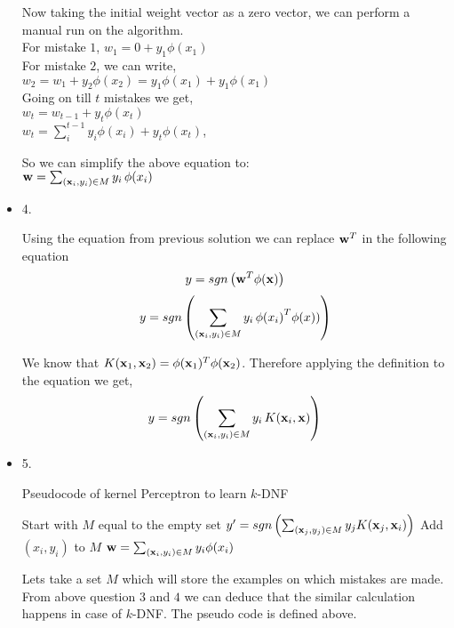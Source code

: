 \documentclass[12pt]{exam}
\newcommand{\bx}{{\bf x}}
\newcommand{\bw}{{\bf w}}
\begin{document}
\begin{itemize}
\begin{solution}
Now taking the initial weight vector as a zero vector, we can perform a manual run on the algorithm.\\

For mistake $1$, $w_1= 0 + y_1 \phi(x_1) $\\

For mistake $2$, we can write,\\
$w_2= w_1 + y_2 \phi(x_2) = y_1 \phi(x_1)+y_1 \phi(x_1)$  \\

Going on till $t$ mistakes we get,\\
$w_t= w_{t-1} + y_t \phi(x_t)$\\
$w_t= \sum_{i}^{t-1} y_i \phi(x_i) + y_t \phi(x_t)$,
  
So we can simplify the above equation to:\\ 
  
$\bw = \sum_{(\bx_i, y_i) \in M} y_i \, \phi(x_i)$
\end{solution}

\item[] 4.
\begin{solution}
Using the equation from previous solution we can replace $\bw^T$ in the following equation\\

 \[y=sgn\left(\bw^T\phi(\bx)\right)\]
 \[y=sgn\left(\sum_{(\bx_i, y_i) \in M} y_i \, {\phi(x_i)}^T \phi(x))\right)\]
 
 We know that  $K(\bx_1, \bx_2) = \phi(\bx_1)^T\phi(\bx_2)$. Therefore applying the definition to the equation we get, \\
  \[y=sgn\left(\sum_{(\bx_i, y_i) \in M} y_i \, K(\bx_i,\bx)\right)\]
\end{solution}

\item[] 5.


\begin{algorithm*}
\caption{Pseudocode of kernel Perceptron to learn $k$-DNF}
\begin{algorithmic}
\STATE Start with $M$ equal to the empty set
\STATE ${y'}= sgn\left(\sum_{(\bx_j, y_j) \in M} y_j  K(\bx_j,\bx_i)\right)$
\STATE Add $(x_i,y_i)$ to $M$
\STATE $\bw = \sum_{(\bx_i, y_i) \in M} y_i \phi(x_i)$
\ENDIF
\ENDFOR
\end{algorithmic}
\end{algorithm*}
\begin{solution}
Lets take a set $M$ which will store the examples on which mistakes are made. From above question $3$ and $4$ we can deduce that the similar calculation happens in case of $k$-DNF. The pseudo code is defined above.
\end{solution}
\end{itemize}
\end{document}
